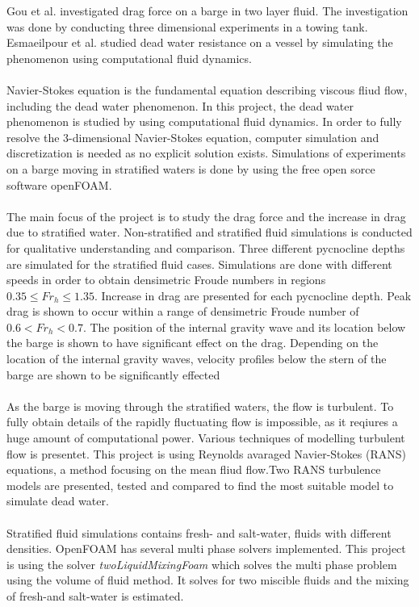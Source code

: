 \documentclass[a4paper, 12pt]{report}
\begin{document}
Gou et al. investigated drag force on a barge in two layer fluid. The investigation was done by conducting three dimensional experiments in a towing tank. \\
Esmaeilpour et al. studied dead water resistance on a vessel by simulating the phenomenon using computational fluid dynamics.\\
\\
Navier-Stokes equation is the fundamental equation describing viscous fliud flow, including the dead water phenomenon. In this project, the dead water phenomenon is studied by using computational fluid dynamics. In order to fully resolve the 3-dimensional Navier-Stokes equation, computer simulation and discretization is needed as no explicit solution exists. Simulations of experiments on a barge moving in stratified waters is done by using the free open sorce software openFOAM.\\
\\
The main focus of the project is to study the drag force and the increase in drag due to stratified water. Non-stratified and stratified fluid simulations is conducted for qualitative understanding and comparison. Three different pycnocline depths are simulated for the stratified fluid cases. Simulations are done with different speeds in order to obtain densimetric Froude numbers in regions $0.35 \leq Fr_h \leq 1.35$.  Increase in drag are presented for each pycnocline depth. Peak drag is shown to occur within a range of densimetric Froude number of $0.6 < Fr_h < 0.7$. The position of the internal gravity wave and its location below the barge is shown to have significant effect on the drag. Depending on the location of the internal gravity waves, velocity profiles below the stern of the barge are shown to be significantly effected \\
\\
As the barge is moving through the stratified waters, the flow is turbulent. To fully obtain details of the rapidly fluctuating flow is impossible, as it reqiures a huge amount of computational power. Various techniques of modelling turbulent flow is presentet. This project is using Reynolds avaraged Navier-Stokes (RANS) equations, a method focusing on the mean fliud flow.Two RANS turbulence models are presented, tested and compared to find the most suitable model to simulate dead water.\\
\\
Stratified fluid simulations contains fresh- and salt-water, fluids with different densities. OpenFOAM has several multi phase solvers implemented. This project is using the solver \textit{twoLiquidMixingFoam} which solves the multi phase problem using the volume of fluid method. It solves for two miscible fluids and the mixing of fresh-and salt-water is estimated.\\
\end{document}
